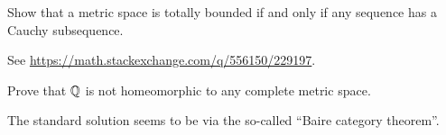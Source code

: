 \begin{problem}
	Show that a metric space is totally bounded
	if and only if any sequence has a Cauchy subsequence.
	\begin{sol}
		See \url{https://math.stackexchange.com/q/556150/229197}.
	\end{sol}
\end{problem}

\begin{problem}
	\kurumi
	Prove that $\mathbb Q$ is not homeomorphic to any complete metric space.
	\begin{hint}
		The standard solution seems to be
		via the so-called ``Baire category theorem''.
	\end{hint}
\end{problem}
